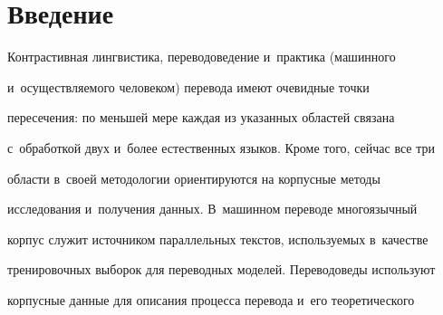   




  


  












 \thispagestyle{headings}


 


 \vspace*{-22pt}


 


  \section{Введение}


  


  \vspace*{-6pt}


  


  Контрастивная лингвистика, переводоведение и~практика (машинного 


и~осуществляемого человеком) перевода имеют очевидные точки 


пересечения: по меньшей мере каж\-дая из указанных областей связана 


с~обработкой двух и~более естественных языков. Кроме того, сейчас все три 


области в~своей методологии ориентируются на корпусные методы 


исследования и~получения данных. В~машинном переводе многоязычный 


корпус служит источником параллельных текстов, используемых в~качестве 


тренировочных выборок для переводных моделей. Переводоведы используют 


корпусные данные для описания процесса перевода и~его теоретического 


